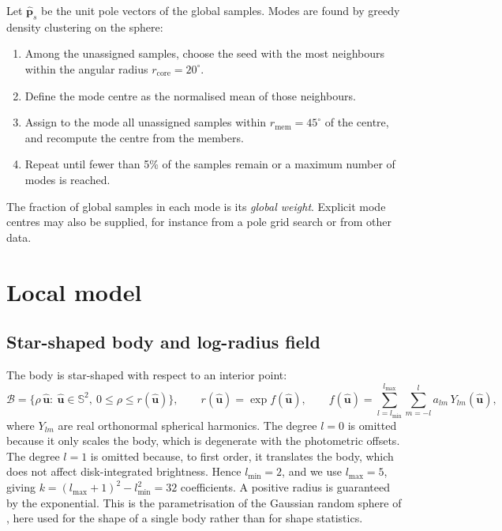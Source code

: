 \documentclass[11pt,a4paper]{article}
\theoremstyle{remark}
\newcommand{\uv}[1]{\hat{\bm{#1}}}
\newcommand{\Sph}{\mathbb{S}^2}
\begin{document}
Let $\uv p_s$ be the unit pole vectors of the global samples. Modes are found by greedy density
clustering on the sphere:
\begin{enumerate}[nosep]
\item Among the unassigned samples, choose the seed with the most neighbours within the angular radius
  $r_{\mathrm{core}}=20^\circ$.
\item Define the mode centre as the normalised mean of those neighbours.
\item Assign to the mode all unassigned samples within $r_{\mathrm{mem}}=45^\circ$ of the centre, and
  recompute the centre from the members.
\item Repeat until fewer than 5\% of the samples remain or a maximum number of modes is reached.
\end{enumerate}
The fraction of global samples in each mode is its \emph{global weight}. Explicit mode centres may also
be supplied, for instance from a pole grid search or from other data.

\section{Local model}
\label{sec:local}

\subsection{Star-shaped body and log-radius field}
The body is star-shaped with respect to an interior point:
\begin{equation}
  \mathcal B=\{\rho\,\uv u:\ \uv u\in\Sph,\ 0\le\rho\le r(\uv u)\},\qquad
  r(\uv u)=\exp f(\uv u),\qquad
  f(\uv u)=\sum_{l=l_{\min}}^{l_{\max}}\sum_{m=-l}^{l}a_{lm}\,Y_{lm}(\uv u),
  \label{eq:field}
\end{equation}
where $Y_{lm}$ are real orthonormal spherical harmonics. The degree $l=0$ is omitted because it only
scales the body, which is degenerate with the photometric offsets. The degree $l=1$ is omitted because,
to first order, it translates the body, which does not affect disk-integrated brightness. Hence
$l_{\min}=2$, and we use $l_{\max}=5$, giving $k=(l_{\max}+1)^2-l_{\min}^2=32$ coefficients. A positive
radius is guaranteed by the exponential. This is the parametrisation of the Gaussian random sphere of
\citet{muinonen1998}, here used for the shape of a single body rather than for shape statistics.
\end{document}
